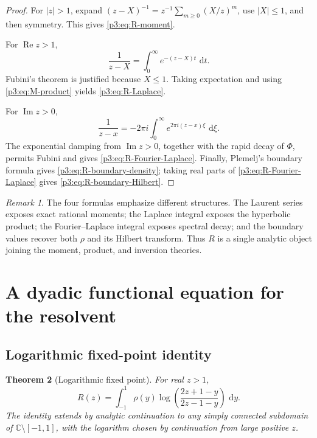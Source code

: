 \documentclass[11pt]{article}
\newtheorem{theorem}{Theorem}[section]
\theoremstyle{definition}
\theoremstyle{remark}
\newtheorem{remark}[theorem]{Remark}
\newcommand{\C}{\mathbb C}
\newcommand{\dd}{\,\mathrm d}
\begin{document}
\begin{proof}
For \(|z|>1\), expand \((z-X)^{-1}=z^{-1}\sum_{m\ge0}(X/z)^m\), use
\(|X|\le1\), and then symmetry.  This gives \eqref{p3:eq:R-moment}.

For \(\operatorname{Re}z>1\),
\[
 \frac1{z-X}=\int_0^{\infty}e^{-(z-X)t}\,\dd t.
\]
Fubini's theorem is justified because \(X\le1\).  Taking expectation and using
\eqref{p3:eq:M-product} yields \eqref{p3:eq:R-Laplace}.

For \(\operatorname{Im}z>0\),
\[
 \frac1{z-x}=-2\pi i\int_0^{\infty}e^{2\pi i(z-x)\xi}\,\dd\xi.
\]
The exponential damping from \(\operatorname{Im}z>0\), together with the rapid decay of
\(\Phi\), permits Fubini and gives \eqref{p3:eq:R-Fourier-Laplace}.  Finally,
Plemelj's boundary formula gives \eqref{p3:eq:R-boundary-density}; taking real parts of
\eqref{p3:eq:R-Fourier-Laplace} gives \eqref{p3:eq:R-boundary-Hilbert}.
\end{proof}

\begin{remark}
The four formulas emphasize different structures.  The Laurent series exposes exact
rational moments; the Laplace integral exposes the hyperbolic product; the Fourier--Laplace
integral exposes spectral decay; and the boundary values recover both \(\rho\) and its
Hilbert transform.  Thus \(R\) is a single analytic object joining the moment, product,
and inversion theories.
\end{remark}

\section{A dyadic functional equation for the resolvent}

\subsection{Logarithmic fixed-point identity}

\begin{theorem}[Logarithmic fixed point]\label{p3:thm:R-log-fixed}
For real \(z>1\),
\begin{equation}
 R(z)=\int_{-1}^{1}\rho(y)
 \log\!\left(\frac{2z+1-y}{2z-1-y}\right)\,\dd y.           \label{p3:eq:R-log-fixed}
\end{equation}
The identity extends by analytic continuation to any simply connected subdomain of
\(\C\setminus[-1,1]\), with the logarithm chosen by continuation from large positive
\(z\).
\end{theorem}
\end{document}
